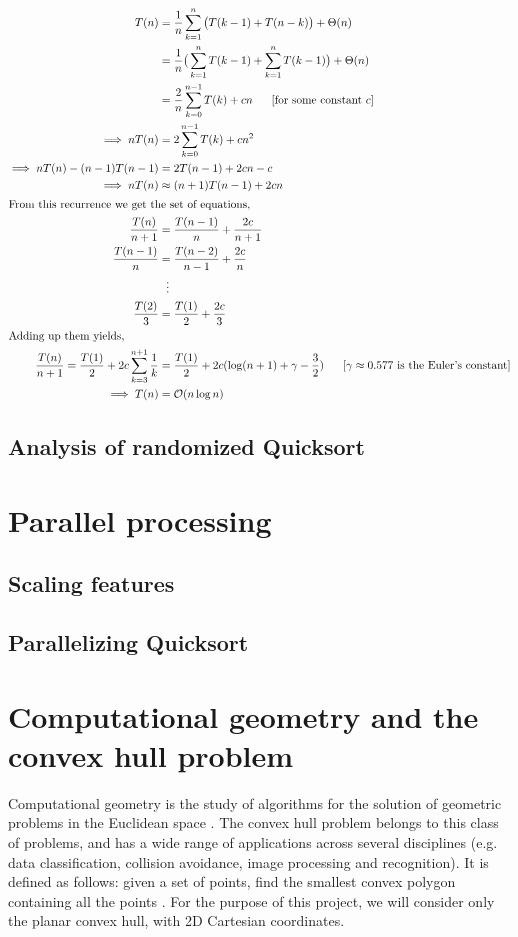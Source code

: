 \documentclass[]{finalproject}
\begin{document}
\begin{align*}
T(n) &= \frac{1}{n}\sum_{k=1}^{n}\big(T(k-1) + T(n-k)\big) + \Theta(n) \\
&= \frac{1}{n}\big(\sum_{k=1}^{n}T(k-1) + \sum_{k=1}^{n}T(k-1)\big) + \Theta(n) \\
&= \frac{2}{n}\sum_{k=0}^{n-1}T(k) + cn ~~~~~[\text{for some constant $c$}]\\
\implies nT(n) &= 2\sum_{k=0}^{n-1}T(k) + cn^2 \\
\implies nT(n) - (n-1)T(n-1) &= 2T(n-1) + 2cn - c \\
\implies nT(n) &\approx (n+1)T(n-1) + 2cn \\
\shortintertext{From this recurrence we get the set of equations,}
\frac{T(n)}{n+1} &= \frac{T(n-1)}{n} + \frac{2c}{n+1} \\
\frac{T(n-1)}{n} &= \frac{T(n-2)}{n-1} + \frac{2c}{n} \\
&~~\vdots \\
\frac{T(2)}{3} &= \frac{T(1)}{2} + \frac{2c}{3} \\
\shortintertext{Adding up them yields,}
\frac{T(n)}{n+1} =  \frac{T(1)}{2} + 2c \sum_{k=3}^{n+1}\frac{1}{k} &= \frac{T(1)}{2} + 2c(\log(n+1) + \gamma - \frac{3}{2}) ~~~~~[\text{$\gamma \approx 0.577$ is the Euler's constant}] \\
\implies T(n) &= \mathcal{O}(n\log n)
\end{align*}

\subsection{Analysis of randomized Quicksort}

\section{Parallel processing}
\subsection{Scaling features}
\subsection{Parallelizing Quicksort}

\section{Computational geometry and the convex hull problem}
Computational geometry is the study of algorithms for the solution of geometric problems in the Euclidean space \cite{jaja2000perspective}.
The convex hull problem belongs to this class of problems, and has a wide range of applications across several disciplines
(e.g. data classification, collision avoidance, image processing and recognition). It is defined as follows:
given a set of points, find the smallest convex polygon containing all the points \cite{geowiki}.
For the purpose of this project, we will consider only the planar convex hull, with 2D Cartesian coordinates.
\end{document}
